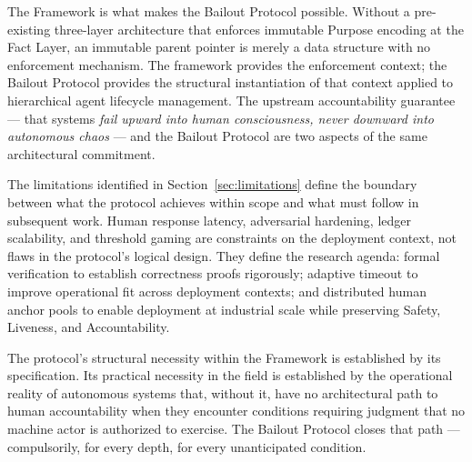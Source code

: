 The \bxthree{} Framework is what makes the Bailout Protocol possible. Without a pre-existing three-layer architecture that enforces immutable Purpose encoding at the Fact Layer, an immutable parent pointer is merely a data structure with no enforcement mechanism. The framework provides the enforcement context; the Bailout Protocol provides the structural instantiation of that context applied to hierarchical agent lifecycle management. The upstream accountability guarantee — that \bxthree{} systems \emph{fail upward into human consciousness, never downward into autonomous chaos} — and the Bailout Protocol are two aspects of the same architectural commitment.

The limitations identified in Section~\ref{sec:limitations} define the boundary between what the protocol achieves within scope and what must follow in subsequent work. Human response latency, adversarial hardening, ledger scalability, and threshold gaming are constraints on the deployment context, not flaws in the protocol's logical design. They define the research agenda: formal verification to establish correctness proofs rigorously; adaptive timeout to improve operational fit across deployment contexts; and distributed human anchor pools to enable deployment at industrial scale while preserving Safety, Liveness, and Accountability.

The protocol's structural necessity within the \bxthree{} Framework is established by its specification. Its practical necessity in the field is established by the operational reality of autonomous systems that, without it, have no architectural path to human accountability when they encounter conditions requiring judgment that no machine actor is authorized to exercise. The Bailout Protocol closes that path — compulsorily, for every depth, for every unanticipated condition.